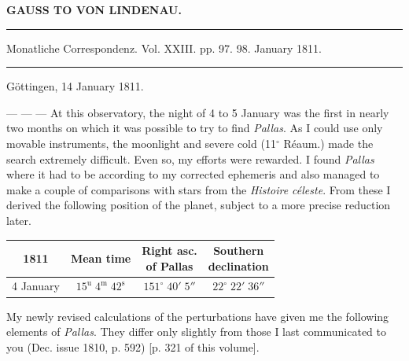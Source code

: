\clearpage{}
\begin{center}\textbf{GAUSS TO VON LINDENAU.}\par\vspace{4pt}\hrule\vspace{4pt}\fontsize{10}{12}\selectfont Monatliche Correspondenz. Vol. XXIII. pp. 97. 98. January 1811.\par\vspace{4pt}\hrule\vspace{4pt}\end{center}

\begin{flushright}Göttingen, 14 January 1811.\end{flushright}
\par\indent --- --- --- At this observatory, the night of 4 to 5 January was the first in nearly two months on which it was possible to try to find \emph{Pallas}. As I could use only movable instruments, the moonlight and severe cold (11$^\circ$ Réaum.) made the search extremely difficult. Even so, my efforts were rewarded. I found \emph{Pallas} where it had to be according to my corrected ephemeris and also managed to make a couple of comparisons with stars from the \emph{Histoire céleste}. From these I derived the following position of the planet, subject to a more precise reduction later.

\begin{center}\fontsize{10}{12}\selectfont\setlength{\tabcolsep}{4pt}\renewcommand{\arraystretch}{1.15}\begin{tabular}{c|c|c|c}
1811 & Mean time & \shortstack{Right asc.\\of Pallas} & \shortstack{Southern\\declination}\\\hline
4 January & $15^{\text{u}}\;4^{\text{m}}\;42^{\text{s}}$ & $151^\circ\;40'\;5''$ & $22^\circ\;22'\;36''$\\
\end{tabular}\end{center}

\par\indent My newly revised calculations of the perturbations have given me the following elements of \emph{Pallas}. They differ only slightly from those I last communicated to you (Dec. issue 1810, p. 592) [p. 321 of this volume].

